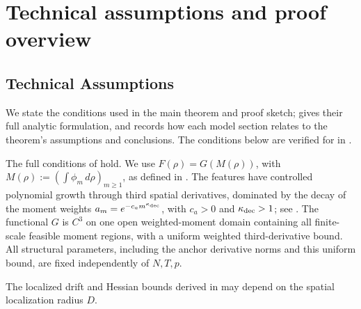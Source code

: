 \section{Technical assumptions and proof overview}
\label{sec:proof-overview}

\subsection{Technical Assumptions}
\label{subsec:tracking-assumptions}

We state the conditions used in the main theorem and proof sketch;
 gives their full analytic formulation,
and  records how each model section relates to
the theorem's assumptions and conclusions.
The conditions below are verified for
 in
.
\begin{assumption}
\label{assumption-main-general-moment-smooth-compressed}
The full conditions of  hold.
We use \(F(\rho)=G(M(\rho))\), with
\(M(\rho):=(\int\phi_m\,d\rho)_{m\ge1}\), as defined in
.
The features have controlled polynomial growth through third spatial
derivatives, dominated by the decay of the moment weights
\(a_m=e^{-c_am^{\kappa_{\rm dec}}}\), with \(c_a>0\) and
\(\kappa_{\rm dec}>1\); see
.
The functional \(G\) is \(C^3\) on one open weighted-moment domain
containing all finite-scale feasible moment regions, with a uniform
weighted third-derivative bound.
All structural parameters, including the anchor derivative norms and this
uniform bound, are fixed independently of \(N,T,p\).
\end{assumption}

The localized drift and Hessian bounds derived in
may depend on the spatial localization radius \(D\).

